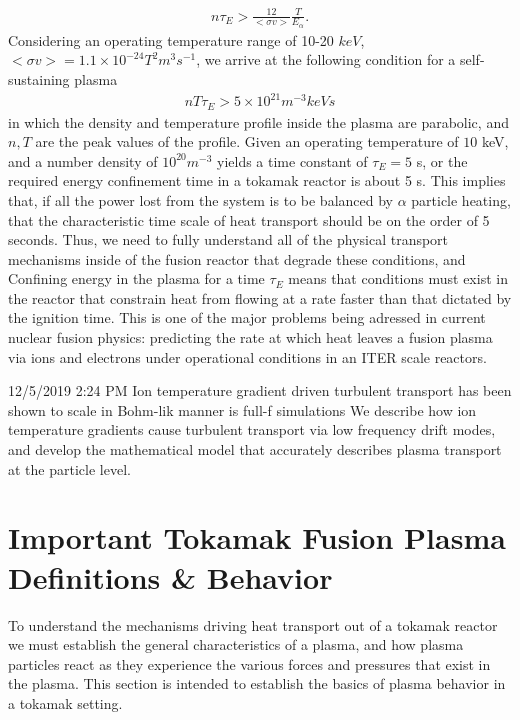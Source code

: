 \documentclass{article}
\begin{document}
\begin{align*}
n\tau_E > \frac{12}{<\sigma v>}\frac{T}{E_\alpha}. 
\end{align*}
Considering an operating temperature range of 10-20 $keV$, $<\sigma v> = 1.1 \times 10^{-24} T^2 m^3 s^{-1}$, we arrive at the following condition for a self-sustaining plasma
\begin{align*}
nT \tau_E > 5 \times 10^{21} m^{-3} keV s
\end{align*} 
in which the density and temperature profile inside the plasma are parabolic, and $n,T$ are the peak values of the profile. Given an operating temperature of $10$ keV, and a number density of $10^20 m^{-3}$ yields a time constant of $\tau_E =5$ s, or the required energy confinement time in a tokamak reactor is about 5 s. This implies that, if all the power lost from the system is to be balanced by $\alpha$ particle heating, that the characteristic time scale of heat transport should be on the order of 5 seconds. Thus, we need to fully understand all of the physical transport mechanisms inside of the fusion reactor that degrade these conditions, and \\
Confining energy in the plasma for a time $\tau_E$ means that conditions must exist in the reactor that constrain heat from flowing at a rate faster than that dictated by the ignition time. This is one of the major problems being adressed in current nuclear fusion physics: predicting the rate at which heat leaves a fusion plasma via ions and electrons under operational conditions in an ITER scale reactors.

12/5/2019 2:24 PM
Ion temperature gradient driven turbulent transport has been shown to scale in Bohm-lik manner is full-f simulations
We describe how ion temperature gradients cause turbulent transport via low frequency drift modes, and develop the mathematical model that accurately describes plasma transport at the particle level.




\section{Important Tokamak Fusion Plasma Definitions \& Behavior}
To understand the mechanisms driving heat transport out of a tokamak reactor we must establish the general characteristics of a plasma, and how plasma particles react as they experience the various forces and pressures that exist in the plasma. This section is intended to establish the basics of plasma behavior in a tokamak setting.
\end{document}
